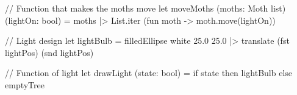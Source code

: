 
// Function that makes the moths move
let moveMoths (moths: Moth list) (lightOn: bool) =
    moths |> List.iter (fun moth -> moth.move(lightOn))


// Light design
let lightBulb =
    filledEllipse white 25.0 25.0
    |> translate (fst lightPos) (snd lightPos)

// Function of light 
let drawLight (state: bool) = 
    if state then
        lightBulb
    else 
        emptyTree
